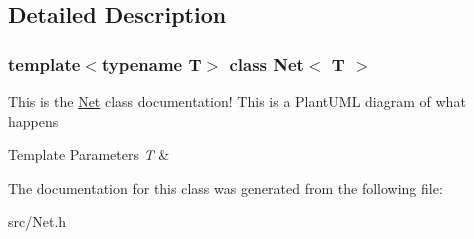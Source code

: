 \subsection{Detailed Description}
\subsubsection*{template$<$typename T$>$\newline
class Net$<$ T $>$}

This is the \hyperlink{classNet}{Net} class documentation! This is a Plant\+U\+ML diagram of what happens  
\begin{DoxyTemplParams}{Template Parameters}
{\em T} & \\
\hline
\end{DoxyTemplParams}


The documentation for this class was generated from the following file\+:\begin{DoxyCompactItemize}
\item 
src/Net.\+h\end{DoxyCompactItemize}
